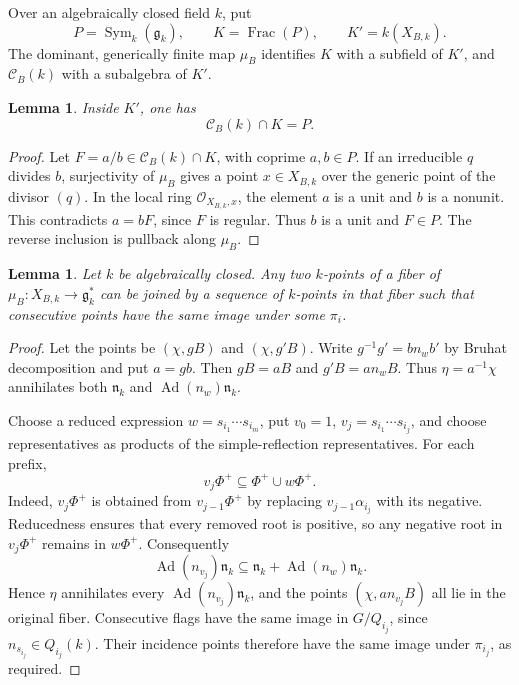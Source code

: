 \documentclass[twoside,a4paper,12pt,reqno]{amsart}
\newtheorem{lemma}[theorem]{Lemma}
\theoremstyle{remark}
\numberwithin{equation}{section}
\newcommand{\cO}{\mathcal O}
\newcommand{\fg}{\mathfrak g}
\newcommand{\fn}{\mathfrak n}
\DeclareMathOperator{\Sym}{Sym}
\DeclareMathOperator{\Ad}{Ad}
\DeclareMathOperator{\Frac}{Frac}
\begin{document}
Over an algebraically closed field \(k\), put
\[
P=\Sym_k(\fg_k),\qquad K=\Frac(P),\qquad K'=k(X_{B,k}).
\]
The dominant, generically finite map \(\mu_B\) identifies \(K\)
with a subfield of \(K'\), and \(\mathcal C_B(k)\) with a subalgebra
of \(K'\).

\begin{lemma}\label{lem:polynomial-descent}
Inside \(K'\), one has
\[
\mathcal C_B(k)\cap K=P.
\]
\end{lemma}
\begin{proof}
Let \(F=a/b\in\mathcal C_B(k)\cap K\), with coprime \(a,b\in P\).
If an irreducible \(q\) divides \(b\), surjectivity of \(\mu_B\)
gives a point \(x\in X_{B,k}\) over the generic point of the divisor
\((q)\). In the local ring \(\cO_{X_{B,k},x}\), the element \(a\)
is a unit and \(b\) is a nonunit. This contradicts \(a=bF\), since
\(F\) is regular. Thus \(b\) is a unit and \(F\in P\).
The reverse inclusion is pullback along \(\mu_B\).
\end{proof}

\begin{lemma}\label{lem:bruhat-compatibility}
Let \(k\) be algebraically closed.
Any two \(k\)-points of a fiber of \(\mu_B:X_{B,k}\to\fg_k^*\) can be joined
by a sequence of \(k\)-points in that fiber such that consecutive points
have the same image under some \(\pi_i\).
\end{lemma}
\begin{proof}
Let the points be \((\chi,gB)\) and \((\chi,g'B)\).
Write \(g^{-1}g'=b n_w b'\) by Bruhat decomposition and put \(a=gb\).
Then \(gB=aB\) and \(g'B=a n_wB\).
Thus \(\eta=a^{-1}\chi\) annihilates both
\(\fn_k\) and \(\Ad(n_w)\fn_k\).

Choose a reduced expression \(w=s_{i_1}\cdots s_{i_m}\), put
\(v_0=1\), \(v_j=s_{i_1}\cdots s_{i_j}\), and choose representatives
as products of the simple-reflection representatives.
For each prefix,
\[
v_j\Phi^+\subseteq\Phi^+\cup w\Phi^+.
\]
Indeed, \(v_j\Phi^+\) is obtained from \(v_{j-1}\Phi^+\) by replacing
\(v_{j-1}\alpha_{i_j}\) with its negative. Reducedness ensures that
every removed root is positive, so any negative root in \(v_j\Phi^+\)
remains in \(w\Phi^+\).
Consequently
\[
\Ad(n_{v_j})\fn_k\subseteq\fn_k+\Ad(n_w)\fn_k.
\]
Hence \(\eta\) annihilates every \(\Ad(n_{v_j})\fn_k\), and the
points \((\chi,a n_{v_j}B)\) all lie in the original fiber.
Consecutive flags have the same image in \(G/Q_{i_j}\), since
\(n_{s_{i_j}}\in Q_{i_j}(k)\). Their incidence points therefore have
the same image under \(\pi_{i_j}\), as required.
\end{proof}
\end{document}
